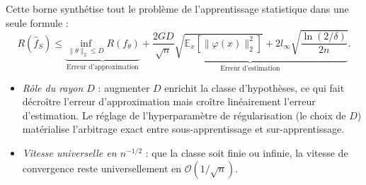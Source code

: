 \begin{remark}
    Cette borne synthétise tout le problème de l'apprentissage statistique dans une seule formule :
    \begin{equation*}
        R(\hat{f}_S) \leqslant \underbrace{\inf_{\|\theta\|_2 \leqslant D} R(f_\theta)}_{\text{Erreur d'approximation}} + \underbrace{\frac{2GD}{\sqrt{n}}\sqrt{\mathbb{E}_x \left[ \|\varphi(x)\|_2^2 \right]} + 2 l_\infty \sqrt{\frac{\ln(2/\delta)}{2n}}}_{\text{Erreur d'estimation}}.
    \end{equation*}
    \begin{itemize}
        \item \emph{Rôle du rayon $D$} : augmenter $D$ enrichit la classe d'hypothèses, ce qui fait décroître l'erreur d'approximation mais croître linéairement l'erreur d'estimation. Le réglage de l'hyperparamètre de régularisation (le choix de $D$) matérialise l'arbitrage exact entre sous-apprentissage et sur-apprentissage.
        \item \emph{Vitesse universelle en $n^{-1/2}$} : que la classe soit finie ou infinie, la vitesse de convergence reste universellement en $\mathcal{O}(1/\sqrt{n})$.
    \end{itemize}
\end{remark}